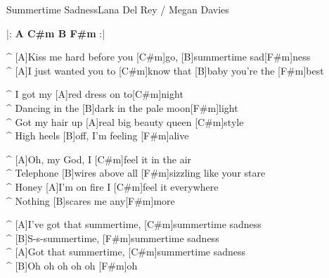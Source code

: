 \begin{song}{Summertime Sadness}{Lana Del Rey / Megan Davies}

\vspace{3mm}
\begin{guitar}
|: \textbf{A C#m B F#m} :|\\
\end{guitar}


\vspace{3mm}
\begin{guitar}
^ [A]Kiss me hard before you [C#m]go, [B]summertime sad[F#m]ness\\
^ [A]I just wanted you to [C#m]know that [B]baby you're the [F#m]best\\
\end{guitar}


\vspace{3mm}
\begin{guitar}
^ I got my [A]red dress on to[C#m]night\\
^ Dancing in the [B]dark in the pale moon[F#m]light\\
^ Got my hair up [A]real big beauty queen [C#m]style\\
^ High heels [B]off, I'm feeling [F#m]alive\\
\end{guitar}

\vspace{3mm}
\begin{guitar}
^ [A]Oh, my God, I [C#m]feel it in the air\\
^ Telephone [B]wires above all [F#m]sizzling like your stare\\
^ Honey [A]I'm on fire I [C#m]feel it everywhere\\
^ Nothing [B]scares me any[F#m]more\\
\end{guitar}


\vspace{3mm}

\vspace{3mm}
\begin{guitar}
^ [A]I've got that summertime, [C#m]summertime sadness\\
^ [B]S-s-summertime, [F#m]summertime sadness\\
^ [A]Got that summertime, [C#m]summertime sadness \\
^ [B]Oh oh oh oh oh [F#m]oh\\
\end{guitar}



\end{song}
